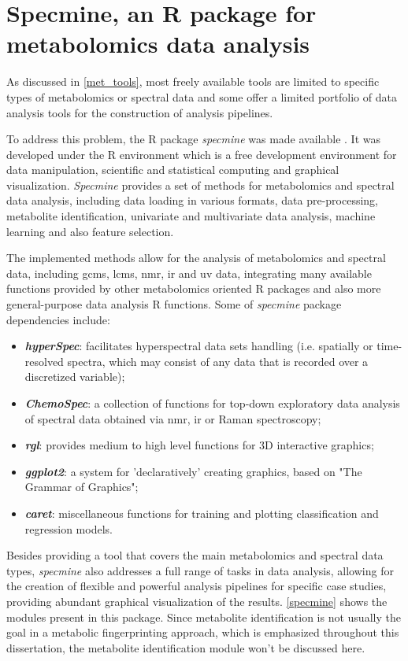 
\section{Specmine, an R package for metabolomics data analysis} \label{specmine_chapter}

As discussed in \autoref{met_tools}, most freely available tools are limited to specific types of metabolomics or spectral data and some offer a limited portfolio of data analysis tools for the construction of analysis pipelines. 

To address this problem, the R package \textit{specmine} was made available \citep{costa2016r}. It was developed under the R environment which is a free development environment for data manipulation, scientific and statistical computing and graphical visualization. \textit{Specmine} provides a set of methods for metabolomics and spectral data analysis, including data loading in various formats, data pre-processing, metabolite identification, univariate and multivariate data analysis, machine learning and also feature selection. 

The implemented methods allow for the analysis of metabolomics and spectral data, including \gls{gcms}, \gls{lcms}, \gls{nmr}, \gls{ir} and \gls{uv} data, integrating many available functions provided by other metabolomics oriented R packages and also more general-purpose data analysis R functions. Some of \textit{specmine} package dependencies include:

\begin{itemize}
	\item \textit{\textbf{hyperSpec}}: facilitates hyperspectral data sets handling (i.e. spatially or time-resolved spectra, which may consist of any data that is recorded over a discretized variable);
	\item \textit{\textbf{ChemoSpec}}: a collection of functions for top-down exploratory data analysis of spectral data obtained via \gls{nmr}, \gls{ir} or Raman spectroscopy;
	\item \textit{\textbf{rgl}}: provides medium to high level functions for 3D interactive graphics;
	\item \textit{\textbf{ggplot2}}: a system for 'declaratively' creating graphics, based on "The Grammar of Graphics";
	\item \textit{\textbf{caret}}: miscellaneous functions for training and plotting classification and regression models.
\end{itemize}

Besides providing a tool that covers the main metabolomics and spectral data types, \textit{specmine} also addresses a full range of tasks in data analysis, allowing for the creation of flexible and powerful analysis pipelines for specific case studies, providing abundant graphical visualization of the results. \autoref{specmine} shows the modules present in this package. Since metabolite identification is not usually the goal in a metabolic fingerprinting approach, which is emphasized throughout this dissertation, the metabolite identification module won't be discussed here.


